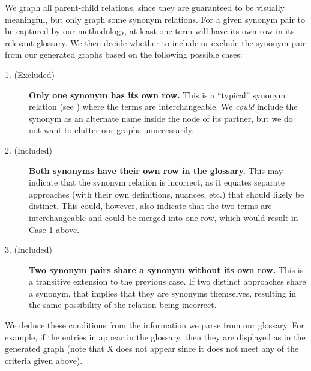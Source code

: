     \newpage\fi
We graph all parent-child relations, since they are guaranteed to be visually
meaningful, but only graph some synonym relations. For a given synonym pair to
be captured by our methodology, at least one term will have its own row in its
relevant glossary. We then decide whether to include or exclude the synonym
pair from our generated graphs based on the following possible cases:
\begin{description}
    \item[1. (Excluded)] \label{case-one}
          \ifnotpaper\else \hfill\break \fi
          \textbf{Only one synonym has its own row.}
          This is a ``typical'' synonym relation (see ) where
          the terms are interchangeable. We \emph{could} include the synonym
          as an alternate name inside the node of its partner, but we do not
          want to clutter our graphs unnecessarily.

    \item[2. (Included)] \label{case-two}
          \ifnotpaper\else \hfill\break \fi
          \textbf{Both synonyms have their own row in the glossary.}
          This may indicate that the synonym relation is incorrect, as it
          equates separate approaches (with their own definitions, nuances,
          etc.) that should likely be distinct. This could, however, also
          indicate that the two terms are interchangeable and could be merged
          into one row, which would result in \hyperref[case-one]{Case 1} above.

    \item[3. (Included)] \label{case-three}
          \ifnotpaper\else\hfill\break\fi
          \textbf{Two synonym pairs share a synonym without its own row.}
          This is a transitive extension to the previous case. If
          two distinct approaches share a synonym, that implies that they are
          synonyms themselves, resulting in the same possibility of the
          relation being incorrect.
\end{description}
\ifnotpaper
    
    We deduce these conditions from the information we parse from our
    glossary. For example, if the entries in 
    appear in the glossary, then they are displayed as 
    in the generated graph (note that X does not appear since it does not
    meet any of the criteria given above).


